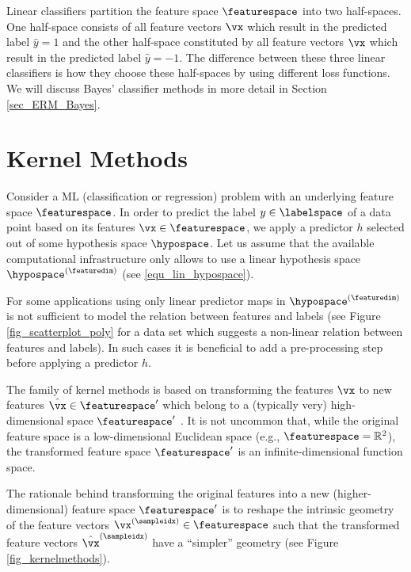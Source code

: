 \documentclass[12pt]{report}
\begin{document}
Linear classifiers partition the feature space $\featurespace$ into two half-spaces. 
One half-space consists of all feature vectors $\vx$ which result in the 
predicted label $\hat{y}=1$ and the other half-space constituted by all 
feature vectors $\vx$ which result in the predicted label $\hat{y}=-1$. 
The difference between these three linear classifiers is how they choose 
these half-spaces by using different loss functions. We will discuss 
Bayes' classifier methods in more detail in Section \ref{sec_ERM_Bayes}.  

 
\section{Kernel Methods} 
\label{sec_kernel_methods}

Consider a ML (classification or regression) problem with an 
underlying feature space $\featurespace$. In order to predict 
the label $y \in \labelspace$ of a data point based on its 
features $\vx \in \featurespace$, we apply a predictor $h$ 
selected out of some hypothesis space $\hypospace$. Let 
us assume that the available computational infrastructure only 
allows to use a linear hypothesis space $\hypospace^{(\featuredim)}$ (see \eqref{equ_lin_hypospace}).

For some applications using only linear predictor maps in 
$\hypospace^{(\featuredim)}$ is not sufficient to model the 
relation between features and labels (see Figure \ref{fig_scatterplot_poly} 
for a data set which suggests a non-linear relation between 
features and labels). In such cases it is beneficial to add a 
pre-processing step before applying a predictor $h$. 

The family of kernel methods is based on transforming the 
features $\vx$ to new features $\hat{\vx} \in \featurespace'$ 
which belong to a (typically very) high-dimensional space $\featurespace'$ \cite{LampertNowKernel}. It is 
not uncommon that, while the original feature space is a 
low-dimensional Euclidean space (e.g., $\featurespace = \mathbb{R}^{2}$), 
the transformed feature space $\featurespace'$ is an infinite-dimensional function space. 

The rationale behind transforming the original features into a 
new (higher-dimensional) feature space $\featurespace'$ is to 
reshape the intrinsic geometry of the feature vectors 
$\vx^{(\sampleidx)} \in \featurespace$ such that the transformed 
feature vectors $\hat{\vx}^{(\sampleidx)}$ have a ``simpler'' 
geometry (see Figure \ref{fig_kernelmethods}). 
\end{document}

